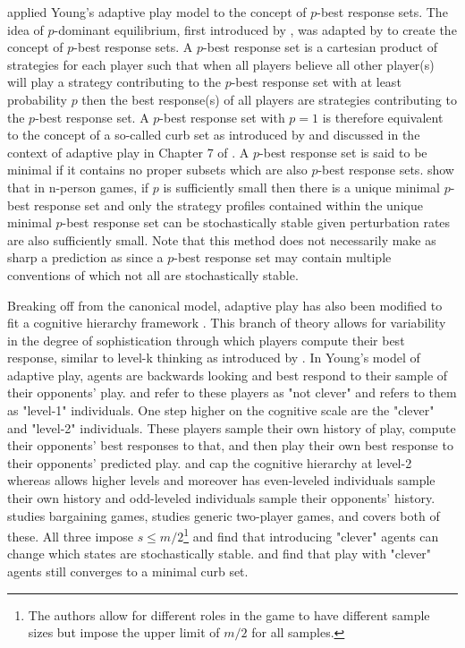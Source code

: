 \documentclass[11.5pt]{article}
\begin{document}
\cite{durieu2011adaptive} applied Young's adaptive play model to the concept of $p$-best response sets. 
The idea of $p$-dominant equilibrium, first introduced by \cite{morris1995p}, was adapted by \cite{tercieux2006p} to create the concept of $p$-best response sets.
A $p$-best response set is a cartesian product of strategies for each player such that when all players believe all other player(s) will play a strategy contributing to the $p$-best response set with at least probability $p$ then the best response(s) of all players are strategies contributing to the $p$-best response set.
A $p$-best response set with $p=1$ is therefore equivalent to the concept of a so-called curb set as introduced by \cite{basu1991strategy} and discussed in the context of adaptive play in Chapter 7 of \cite{Young1998}. 
A $p$-best response set is said to be minimal if it contains no proper subsets which are also $p$-best response sets.  \cite{durieu2011adaptive} show that in n-person games, if $p$ is sufficiently small then there is a unique minimal $p$-best response set and only the strategy profiles contained within the 
unique minimal $p$-best response set can be stochastically stable given perturbation rates are also sufficiently small.
Note that this method does not necessarily make as sharp a prediction as \cite{young1993evolution} since a $p$-best response set may contain multiple conventions of which not all are stochastically stable.

Breaking off from the canonical model, adaptive play has also been modified to fit a cognitive hierarchy framework \citep{saez1999clever, matros2003clever, khan2014cognitive}. This branch of theory allows for variability in the degree of sophistication through which players compute their best response, similar to level-k thinking as introduced by \cite{nagel1995unraveling}. In Young's model of adaptive play, agents are backwards looking and best respond to their sample of their opponents' play. \cite{saez1999clever} and \cite{matros2003clever} refer to these players as "not clever" and \cite{khan2014cognitive} refers to them as "level-1" individuals. One step higher on the cognitive scale are the "clever" and "level-2" individuals. These players sample their own history of play, compute their 
opponents' best responses to that, and then play their own best response to their opponents' predicted play. 
\cite{saez1999clever} and \cite{matros2003clever} cap the cognitive hierarchy at level-2 whereas \cite{khan2014cognitive} allows higher levels and moreover has even-leveled individuals sample their own history and odd-leveled individuals sample their opponents' history. 
\cite{saez1999clever} studies bargaining games, \cite{matros2003clever} studies generic two-player games, and \cite{khan2014cognitive} covers both of these. All three impose $s \leq m/2$\footnote{The authors allow for different roles in the game to have different sample sizes but impose the upper limit of $m/2$ for all samples.} and find that introducing "clever" agents can change which states are stochastically stable. \cite{matros2003clever} and \cite{khan2014cognitive} find that play with "clever" agents still converges to a minimal curb set.
\end{document}
